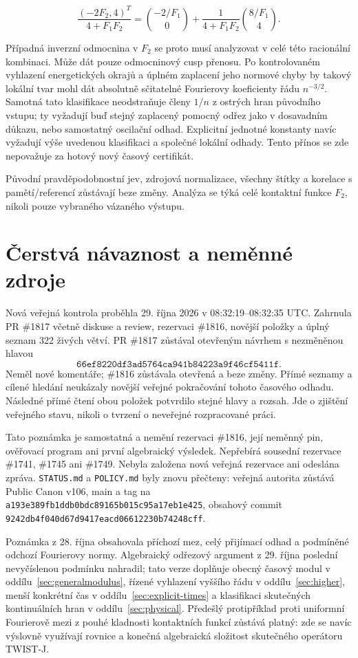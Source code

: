 \documentclass[11pt,a4paper]{article}
\theoremstyle{remark}\newtheorem{remark}[theorem]{Poznámka}
\numberwithin{equation}{section}
\begin{document}
\[
\frac{(-2F_2,4)^T}{4+F_1F_2}
=\binom{-2/F_1}{0}
+\frac1{4+F_1F_2}\binom{8/F_1}{4}.
\tag{PT37}
\]

Případná inverzní odmocnina v \(F_2\) se proto musí analyzovat
v celé této racionální kombinaci. Může dát pouze odmocninový
cusp přenosu. Po kontrolovaném vyhlazení energetických okrajů
a úplném zaplacení jeho normové chyby by takový lokální tvar
mohl dát absolutně sčitatelné Fourierovy koeficienty řádu
\(n^{-3/2}\). Samotná tato klasifikace neodstraňuje členy
\(1/n\) z ostrých hran původního vstupu; ty vyžadují buď
stejný zaplacený pomocný odřez jako v dosavadním důkazu, nebo
samostatný oscilační odhad. Explicitní jednotné konstanty
navíc vyžadují výše uvedenou klasifikaci a společné lokální
odhady. Tento přínos se zde nepovažuje za hotový nový časový
certifikát.

Původní pravděpodobnostní jev, zdrojová normalizace, všechny
štítky a korelace s pamětí/referencí zůstávají beze změny.
Analýza se týká celé kontaktní funkce \(F_2\), nikoli pouze
vybraného vázaného výstupu.


\section{Čerstvá návaznost a neměnné zdroje}
\label{sec:sources}

Nová veřejná kontrola proběhla 29. října 2026 v 08:32:19--08:32:35 UTC. Zahrnula PR \#1817 včetně diskuse a review, rezervaci \#1816, novější položky a úplný seznam 322 živých větví. PR \#1817 zůstával otevřeným návrhem s nezměněnou hlavou
\[
\texttt{66ef8220df3ad5764ca941b84223a9f46cf5411f}.
\]
Neměl nové komentáře; \#1816 zůstávala otevřená a beze změny. Přímé seznamy a cílené hledání neukázaly novější veřejné pokračování tohoto časového odhadu. Následné přímé čtení obou položek potvrdilo stejné hlavy a rozsah. Jde o zjištění veřejného stavu, nikoli o tvrzení o neveřejné rozpracované práci.

Tato poznámka je samostatná a nemění rezervaci \#1816, její neměnný pin, ověřovací program ani první algebraický výsledek. Nepřebírá sousední rezervace \#1741, \#1745 ani \#1749. Nebyla založena nová veřejná rezervace ani odeslána zpráva. \texttt{STATUS.md} a \texttt{POLICY.md} byly znovu přečteny: veřejná autorita zůstává Public Canon v106, main a tag na \texttt{a193e389fb1ddb0bdc89165b015c95a17eb1e425}, obsahový commit \texttt{9242db4f040d67d9417eacd06612230b74248cff}.

Poznámka z 28. října obsahovala příchozí mez, celý přijímací odhad a podmíněné odchozí Fourierovy normy. Algebraický odřezový argument z 29. října poslední nevyčíslenou podmínku nahradil; tato verze doplňuje obecný časový modul v oddílu~\ref{sec:generalmodulus}, řízené vyhlazení vyššího řádu v oddílu~\ref{sec:higher}, menší konkrétní čas v oddílu~\ref{sec:explicit-times} a klasifikaci skutečných kontinuálních hran v oddílu~\ref{sec:physical}. Předešlý protipříklad proti uniformní Fourierově mezi z pouhé kladnosti kontaktních funkcí zůstává platný: zde se navíc výslovně využívají rovnice a konečná algebraická složitost skutečného operátoru TWIST-J.
\end{document}
